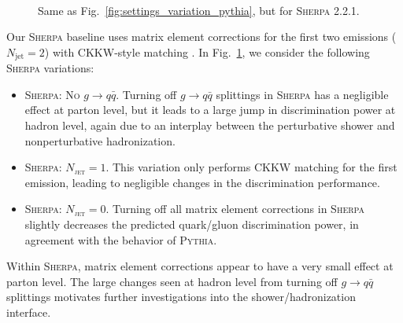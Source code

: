\documentclass[11pt,letterpaper]{article}
\DeclareRobustCommand{\Fig}[1]{Fig.~\ref{#1}}
\begin{document}
\begin{figure}
\centering
{}
$\qquad$
\caption{Same as \Fig{fig:settings_variation_pythia}, but for \textsc{Sherpa 2.2.1}.}
\label{fig:settings_variation_sherpa}
\end{figure}

Our  \textsc{Sherpa} baseline uses matrix element corrections for the first two emissions ($N_\text{jet} = 2$) with CKKW-style matching \cite{Catani:2001cc}.  In \Fig{fig:settings_variation_sherpa}, we consider the following \textsc{Sherpa} variations:
\begin{itemize}
\item \textsc{Sherpa: No $g \to q\bar{q}$}.  Turning off $g \to q \bar{q}$ splittings in \textsc{Sherpa} has a negligible effect at parton level, but it leads to a large jump in discrimination power at hadron level, again due to an interplay between the perturbative shower and nonperturbative hadronization.
\item \textsc{Sherpa: $N_\mathrm{jet} = 1$}.  This variation only performs CKKW matching for the first emission, leading to negligible changes in the discrimination performance.
\item \textsc{Sherpa: $N_\mathrm{jet} = 0$}.  Turning off all matrix element corrections in \textsc{Sherpa} slightly decreases the predicted quark/gluon discrimination power, in agreement with the behavior of \textsc{Pythia}.
\end{itemize}
Within \textsc{Sherpa}, matrix element corrections appear to have a very small effect at parton level.  The large changes seen at hadron level from turning off $g \to q \bar{q}$ splittings motivates further investigations into the shower/hadronization interface.
\end{document}
